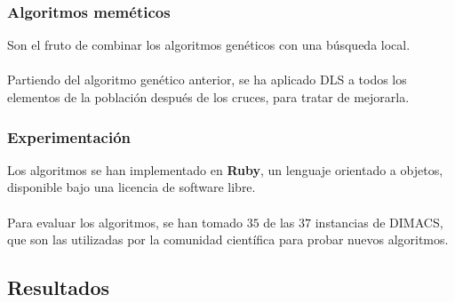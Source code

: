 \documentclass{beamer}
\theoremstyle{theorem}
\begin{document}

\begin{frame}
  \frametitle{Algoritmos meméticos}
  Son el fruto de combinar los algoritmos genéticos con una búsqueda local.  \\~\\

  Partiendo del algoritmo genético anterior, se ha aplicado DLS a todos los elementos de la población después de
  los cruces, para tratar de mejorarla.

\end{frame}

\begin{frame}
  \frametitle{Experimentación}

  Los algoritmos se han implementado en \textbf{Ruby}, un lenguaje orientado a objetos, disponible bajo una
  licencia de software libre. \\~\\

  Para evaluar los algoritmos, se han tomado $35$ de las $37$ instancias de DIMACS, que son las utilizadas por
  la comunidad científica para probar nuevos algoritmos.

\end{frame}



\subsection{Resultados}
\end{document}
